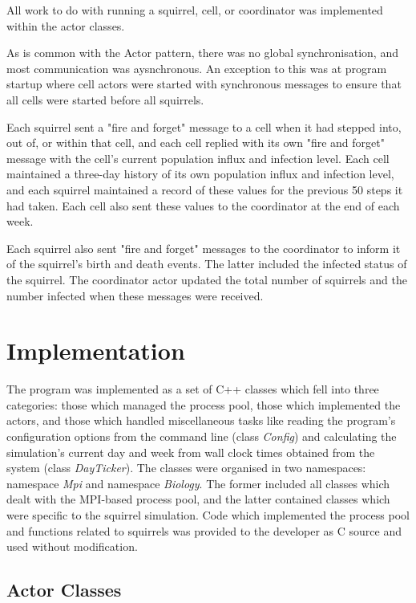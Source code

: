 \documentclass[11pt, oneside]{article}   %
\begin{document}
All work to do with running a squirrel, cell, or coordinator was implemented within the actor classes.

As is common with the Actor pattern, there was no global synchronisation, and most communication was aysnchronous.
An exception to this was at program startup where cell actors were started with synchronous messages to ensure that all cells were started before all squirrels.

Each squirrel sent a "fire and forget" message to a cell when it had stepped into, out of, or within that cell, and each cell replied with its own "fire and forget" message with the cell's current population influx and infection level.
Each cell maintained a three-day history of its own population influx and infection level, and each squirrel maintained a record of these values for the previous 50 steps it had taken.
Each cell also sent these values to the coordinator at the end of each week.

Each squirrel also sent "fire and forget" messages to the coordinator to inform it of the squirrel's birth and death events.
The latter included the infected status of the squirrel.
The coordinator actor updated the total number of squirrels and the number infected when these messages were received.

\newpage

\section{Implementation}

The program was implemented as a set of C++ classes which fell into three categories: those which managed the process pool, those which implemented the actors, and those which handled miscellaneous tasks like reading the program's configuration options from the command line (class {\em Config}) and calculating the simulation's current day and week from wall clock times obtained from the system (class {\em DayTicker}).
The classes were organised in two namespaces: namespace {\em Mpi} and namespace {\em Biology}.
The former included all classes which dealt with the MPI-based process pool, and the latter contained classes which were specific to the squirrel simulation.
Code which implemented the process pool and functions related to squirrels was provided to the developer as C source and used without modification.

\subsection{Actor Classes}
\end{document}
